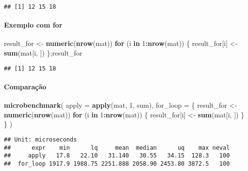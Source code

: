 \documentclass[
]{article}
\newenvironment{Shaded}{\begin{snugshade}}{\end{snugshade}}
\newcommand{\AttributeTok}[1]{\textcolor[rgb]{0.13,0.29,0.53}{#1}}
\newcommand{\ControlFlowTok}[1]{\textcolor[rgb]{0.13,0.29,0.53}{\textbf{#1}}}
\newcommand{\DecValTok}[1]{\textcolor[rgb]{0.00,0.00,0.81}{#1}}
\newcommand{\FunctionTok}[1]{\textcolor[rgb]{0.13,0.29,0.53}{\textbf{#1}}}
\newcommand{\NormalTok}[1]{#1}
\newcommand{\OtherTok}[1]{\textcolor[rgb]{0.56,0.35,0.01}{#1}}
\newcommand{\SpecialCharTok}[1]{\textcolor[rgb]{0.81,0.36,0.00}{\textbf{#1}}}
\begin{document}
\begin{verbatim}
## [1] 12 15 18
\end{verbatim}

\paragraph{Exemplo com for}\label{exemplo-com-for}

\begin{Shaded}
\begin{Highlighting}[]
\NormalTok{result\_for }\OtherTok{\textless{}{-}} \FunctionTok{numeric}\NormalTok{(}\FunctionTok{nrow}\NormalTok{(mat))}
\ControlFlowTok{for}\NormalTok{ (i }\ControlFlowTok{in} \DecValTok{1}\SpecialCharTok{:}\FunctionTok{nrow}\NormalTok{(mat)) \{}
\NormalTok{  result\_for[i] }\OtherTok{\textless{}{-}} \FunctionTok{sum}\NormalTok{(mat[i, ])}
\NormalTok{\};result\_for}
\end{Highlighting}
\end{Shaded}

\begin{verbatim}
## [1] 12 15 18
\end{verbatim}

\paragraph{Comparação}\label{comparauxe7uxe3o}

\begin{Shaded}
\begin{Highlighting}[]
\FunctionTok{microbenchmark}\NormalTok{(}
  \AttributeTok{apply =} \FunctionTok{apply}\NormalTok{(mat, }\DecValTok{1}\NormalTok{, sum),}
  \AttributeTok{for\_loop =}\NormalTok{ \{}
\NormalTok{    result\_for }\OtherTok{\textless{}{-}} \FunctionTok{numeric}\NormalTok{(}\FunctionTok{nrow}\NormalTok{(mat))}
    \ControlFlowTok{for}\NormalTok{ (i }\ControlFlowTok{in} \DecValTok{1}\SpecialCharTok{:}\FunctionTok{nrow}\NormalTok{(mat)) \{}
\NormalTok{      result\_for[i] }\OtherTok{\textless{}{-}} \FunctionTok{sum}\NormalTok{(mat[i, ])}
\NormalTok{    \}}
\NormalTok{  \}}
\NormalTok{)}
\end{Highlighting}
\end{Shaded}

\begin{verbatim}
## Unit: microseconds
##      expr    min      lq     mean  median      uq    max neval
##     apply   17.8   22.10   31.140   30.55   34.15  128.3   100
##  for_loop 1917.9 1988.75 2251.888 2058.90 2453.80 3872.5   100
\end{verbatim}
\end{document}
